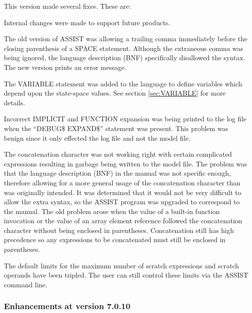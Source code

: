 This version made several fixes.   These are:
\begin{indenteditems}
\item Internal changes were made to support future products.
\item The old version of ASSIST was allowing a trailing comma immediately
      before the closing parenthesis of a SPACE statement.   Although the
      extraneous comma was being ignored, the language description (BNF)
      specifically disallowed the syntax.   The new version prints an
      error message.
\item The VARIABLE statement was added to the language to define variables
      which depend upon the state-space values.   See
      section \ref{sec:VARIABLE} for more details.
\item Incorrect IMPLICIT and FUNCTION expansion was being printed to the
      log file when the ``DEBUG\$ EXPAND\$'' statement was present.   This
      problem was benign since it only effected the log file and not the
      model file.
\item The concatenation character was not working right with certain
      complicated expressions resulting in garbage being written to the
      model file.   The problem was that the language description (BNF)
      in the manual was not specific enough, therefore allowing for a more
      general usage of the concatenation character than was originally
      intended.   It was determined that it would not be very difficult
      to allow the extra syntax, so the ASSIST program was upgraded to
      correspond to the manual.   The old problem arose when the value
      of a built-in function invocation or the value of an array element
      reference followed the concatenation character without being enclosed
      in parentheses.   Concatenation still has high precedence so any
      expressions to be concatenated must still be enclosed in parentheses.
\item The default limits for the maximum number of scratch expressions and
      scratch operands have been tripled.   The user can still control
      these limits via the ASSIST command line.
\end{indenteditems}

\subsubsection{Enhancements at version 7.0.10}

